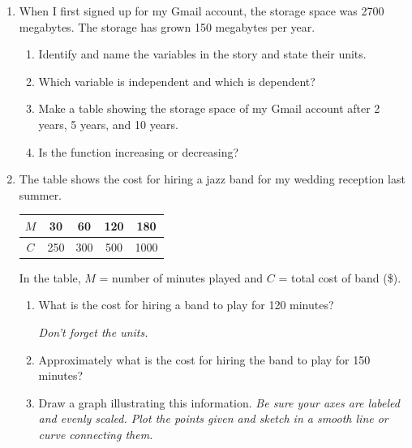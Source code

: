 \documentclass[12pt]{article}
\begin{document}
\begin{enumerate}
\item When I first signed up for my Gmail account, the storage space was 2700 megabytes.  The storage has grown 150 megabytes per year.

\begin{enumerate}
\item Identify and name the variables in the story and state their units.
\vfill
\item Which variable is independent and which is dependent?
\vfill
\item Make a table showing the storage space of my Gmail account after 2 years, 5 years, and 10 years.
\vfill
\vfill
\vfill
\item Is the function increasing or decreasing?
\vfill
\end{enumerate}

\newpage

\item The table shows the cost for hiring a jazz band for my wedding reception last summer.  

\begin{center}
\begin{tabular} {|c|c|c|c|c|} \hline
$M$ & 30 & 60 & 120 & 180 \\ \hline
$C$ & 250 & 300 & 500 & 1000 \\ \hline
\end{tabular}
\end{center}

In the table, $M$ = number of minutes played and $C$ = total cost of band  (\$).

\begin{enumerate}
\item What is the cost for hiring a band to play for 120 minutes?

\emph{Don't forget the units.}
\vfill
\item Approximately what is the cost for hiring the band to play for 150 minutes?
\vfill
\item Draw a graph illustrating this information.  \emph{Be sure your axes are labeled and evenly scaled.  Plot the points given and sketch in a smooth line or curve connecting them.}


\end{enumerate}
\end{enumerate}
\end{document}

